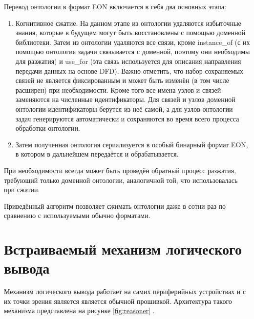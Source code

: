 Перевод онтологии в формат EON включается в себя два основных этапа:
\begin{enumerate}
	\item Когнитивное сжатие. 
	На данном этапе из онтологии удаляются избыточные знания, которые в будущем могут быть восстановлены с помощью доменной библиотеки.
	Затем из онтологии удаляются все связи, кроме instance{\_}of (с их помощью онтология задачи связывается с доменной, поэтому они необходимы для разжатия) и use{\_}for (эта связь используется для описания направления передачи данных на основе DFD).
	Важно отметить, что набор сохраняемых связей не является фиксированным и может быть изменён (в том числе расширен) при необходимости.
	Кроме того все имена узлов и связей заменяются на численные идентификаторы.
	Для связей и узлов доменной онтологии идентификаторы берутся из неё самой, а для узлов онтологии задач генерируются автоматически и сохраняются во время всего процесса обработки онтологии.
	\item Затем полученная онтология сериализуется в особый бинарный формат EON, в котором в дальнейшем передаётся и обрабатывается.
\end{enumerate}

При необходимости всегда может быть проведён обратный процесс разжатия, требующий только доменной онтологии, аналогичной той, что использовалась при сжатии.

Приведённый алгоритм позволяет сжимать онтологии даже в сотни раз по сравнению с используемыми обычно форматами.

\section{Встраиваемый механизм логического вывода}

Механизм логического вывода работает на самих периферийных устройствах и с их точки зрения является является обычной прошивкой.
Архитектура такого механизма представлена на рисунке \ref{fig:reasoner} \cite{incollection:onto-reasoning-on-mcu}.


